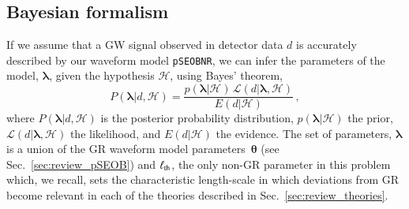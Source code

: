 \documentclass[twocolumn,
               prd,
               aps,
               superscriptaddress,
               tightenlines,
               nofootinbib,
               eqsecnum,
               amsfonts,
               amsmath,
               longbibliography]{revtex4-1}
\newcommand{\pSEOB}{\texttt{pSEOBNR}}
\newcommand{\abcomm}[1]{{\textcolor{red}{{[AB: #1]}}}}
\begin{document}
\subsection{Bayesian formalism}
If we assume that a GW signal observed in detector data $d$ is accurately
described by our waveform model \pSEOB{}, we can infer the parameters of the
model, $\bm{\lambda}$, given the hypothesis $\mathcal{H}$, using Bayes' theorem,
%
\begin{equation}
P(\bm{\lambda} \vert d, \mathcal{H}) =
\frac{p(\bm{\lambda} \vert \mathcal{H}) \, \mathcal{L}(d \vert \bm{\lambda},\mathcal{H})}{E(d \vert \mathcal{H})}\,,
\label{eq:bayes}
\end{equation}
%
where $P(\bm{\lambda} \vert d, \mathcal{H})$ is the posterior probability distribution,
$p(\bm{\lambda} \vert \mathcal{H})$ the prior,
$\mathcal{L}(d \vert \bm{\lambda},\mathcal{H})$ the likelihood, and
$E(d \vert \mathcal{H})$ the evidence.
%
The set of parameters, $\bm{\lambda}$ is a union of the GR waveform
model parameters~$\bm{\theta}$ (see Sec.~\ref{sec:review_pSEOB})
and $\ell_{\rm th}$, the only non-GR parameter in this problem which, we recall, sets
the characteristic length-scale in which deviations from
GR become relevant in each of the theories described in
Sec.~\ref{sec:review_theories}. %
%

\end{document}

